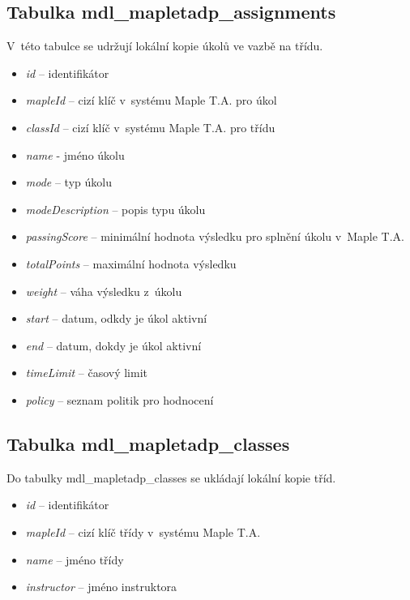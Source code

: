 \documentclass[
print,
  11pt,
  table,   
  nolof,    
  nolot,
  oneside,final
]{fithesis3}
\begin{document}
\subsection*{Tabulka mdl\_mapletadp\_assignments}
V~této tabulce se udržují lokální kopie úkolů ve vazbě na třídu.
\begin{itemize}
	\item \textit{id} -- identifikátor
	\item \textit{mapleId} -- cizí klíč v~systému Maple T.A. pro úkol
	\item \textit{classId} -- cizí klíč v~systému Maple T.A. pro třídu
	\item \textit{name} -  jméno úkolu
	\item \textit{mode} -- typ úkolu
	\item \textit{modeDescription} -- popis typu úkolu
	\item \textit{passingScore} -- minimální hodnota výsledku pro splnění úkolu v~Maple T.A.
	\item \textit{totalPoints} -- maximální hodnota výsledku
	\item \textit{weight} -- váha výsledku z~úkolu
	\item \textit{start} -- datum, odkdy je úkol aktivní
	\item \textit{end} -- datum, dokdy je úkol aktivní
	\item \textit{timeLimit} -- časový limit
	\item \textit{policy} -- seznam politik pro hodnocení
\end{itemize}

\subsection*{Tabulka mdl\_mapletadp\_classes}
Do tabulky mdl\_mapletadp\_classes se ukládají lokální kopie tříd.
\begin{itemize}
	\item \textit{id} -- identifikátor
	\item \textit{mapleId} -- cizí klíč třídy v~systému Maple T.A.
	\item \textit{name} -- jméno třídy
	\item \textit{instructor} -- jméno instruktora
\end{itemize}
\end{document}
